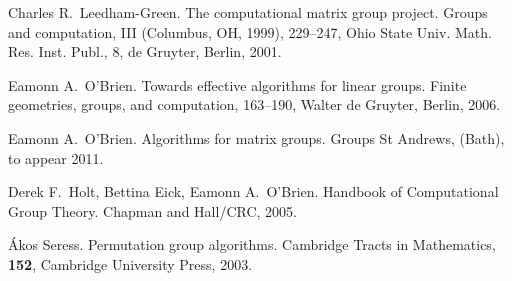 \documentclass[11pt]{article}
\begin{document}
\begin{thebibliography}{[1]}
 Charles R.~Leedham-Green.  \newblock
 The computational matrix group project. \newblock
 Groups and computation, III (Columbus, OH, 1999), 
 229--247, Ohio State Univ. Math. Res. Inst. Publ., 8, de Gruyter,
Berlin,  2001. 
                
 Eamonn A.~O'Brien.  \newblock
 Towards effective algorithms for linear groups. \newblock
 Finite geometries, groups, and computation, 
 163--190, Walter de Gruyter, Berlin,  2006. 

 Eamonn A.~O'Brien.  \newblock
 Algorithms for matrix groups. \newblock
 Groups St Andrews, (Bath), to appear 2011.

 Derek F.~Holt, Bettina Eick, Eamonn A.~O'Brien. \newblock
 Handbook of Computational Group Theory. \newblock
 Chapman and Hall/CRC, 2005.

 {\'A}kos Seress.  \newblock
 Permutation group algorithms. \newblock
 Cambridge Tracts in Mathematics, \textbf{152}, Cambridge University
 Press, 2003.

\end{thebibliography}
\end{document}
